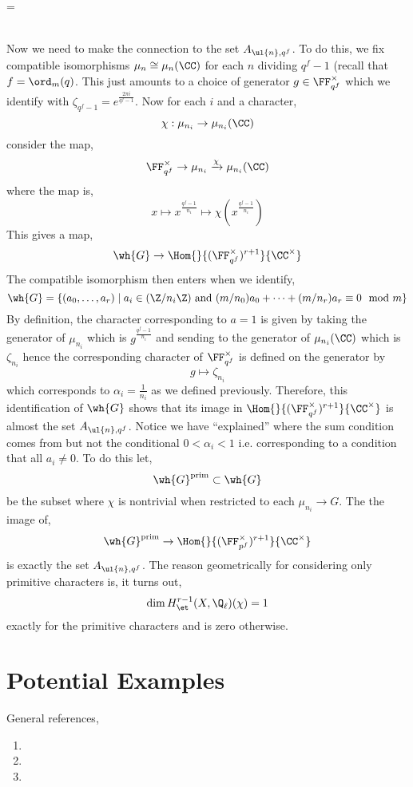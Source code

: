 =\documentclass[12pt]{article}
\begin{document}
\bigskip\\
Now we need to make the connection to the set $A_{\ul{n}, q^f}$. To do this, we fix compatible isomorphisms $\mu_n \cong \mu_n(\CC)$ for each $n$ dividing $q^f - 1$ (recall that $f = \ord_m(q)$. This just amounts to a choice of generator $g \in \FF_{q^f}^\times$ which we identify with $\zeta_{q^f-1} = e^{\frac{2 \pi i}{q^f - 1}}$. Now for each $i$ and a character,
\[ \chi : \mu_{n_i} \to \mu_{n_i}(\CC) \]
consider the map,
\[ \FF_{q^f}^\times \to \mu_{n_i} \xrightarrow{\chi} \mu_{n_i}(\CC) \]
where the map is,
\[ x \mapsto x^{\frac{q^f - 1}{n_i}} \mapsto \chi(x^{\frac{q^f - 1}{n_i}}) \]
This gives a map,
\[ \wh{G} \to \Hom{}{(\FF_{q^f}^\times)^{r+1}}{\CC^\times} \]
The compatible isomorphism then enters when we identify,
\[ \wh{G} = \{ (a_0, \dots, a_r) \mid a_i \in (\Z / n_i \Z) \text{ and } (m/n_0) a_0 + \cdots + (m/n_r) a_r \equiv 0 \mod m \} \]
By definition, the character corresponding to $a = 1$ is given by taking the generator of $\mu_{n_i}$ which is $g^{\frac{q^f - 1}{n_i}}$ and sending to the generator of $\mu_{n_i}(\CC)$ which is $\zeta_{n_i}$ hence the corresponding character of $\FF_{q^f}^\times$ is defined on the generator by
\[ g \mapsto \zeta_{n_i} \]
which corresponds to $\alpha_i = \frac{1}{n_i}$ as we defined previously. Therefore, this identification of $\wh{G}$ shows that its image in $\Hom{}{(\FF_{q^f}^\times)^{r+1}}{\CC^\times}$ is almost the set $A_{\ul{n},q^f}$. Notice we have ``explained'' where the sum condition comes from but not the conditional $0 < \alpha_i < 1$ i.e. corresponding to a condition that all $a_i \neq 0$. To do this let,
\[ \wh{G}^{\text{prim}} \subset \wh{G} \]
be the subset where $\chi$ is nontrivial when restricted to each $\mu_{n_i} \to G$. The the image of,
\[ \wh{G}^{\text{prim}} \to \Hom{}{(\FF_{p^f}^\times)^{r+1}}{\CC^\times} \]
is exactly the set $A_{\ul{n}, q^f}$. The reason geometrically for considering only primitive characters is, it turns out, 
\[ \dim H^{r-1}_{\et}(X, \Q_\ell)(\chi) = 1 \]
exactly for the primitive characters and is zero otherwise. 

\section{Potential Examples}

General references,
\begin{enumerate}
\item {}

\item {}

\item {}
\end{enumerate}
\end{document}
